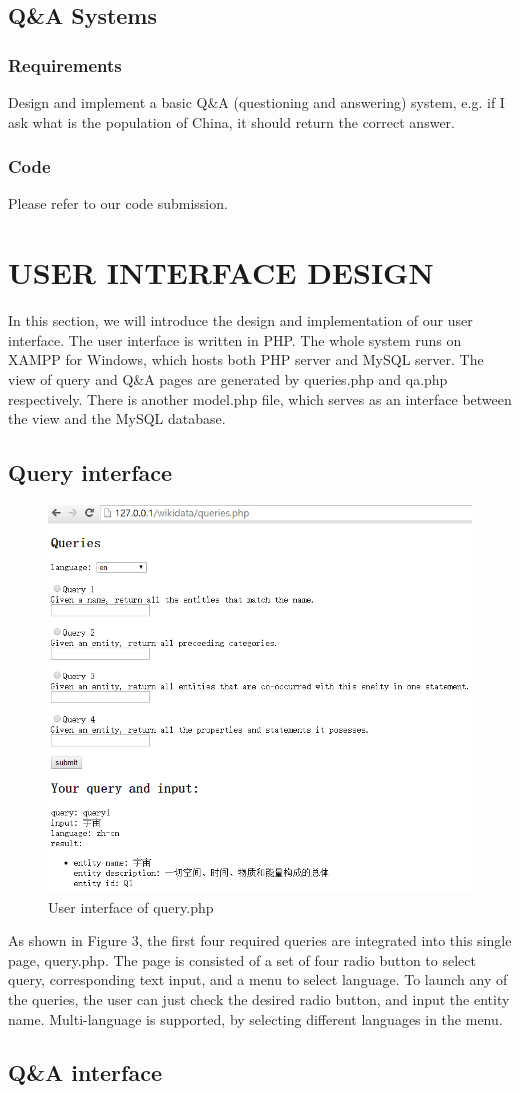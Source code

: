\documentclass[12pt]{article}
\begin{document}
\subsection{Q\&A Systems}
\subsubsection{Requirements}
Design and implement a basic Q\&A (questioning and answering) system, e.g. if I ask what is the population of China, it should return the correct answer.
\subsubsection{Code}
Please refer to our code submission.
\section{USER INTERFACE DESIGN}
In this section, we will introduce the design and implementation of our user interface. The user interface is written in PHP. The whole system runs on XAMPP for Windows, which hosts both PHP server and MySQL server. The view of query and Q\&A pages are generated by queries.php and qa.php respectively. There is another model.php file, which serves as an interface between the view and the MySQL database.
\subsection{Query interface}
\begin{figure}[H]
\centering
\label{fig:3}
\includegraphics[width=1\linewidth]{queryui.png}
\caption{User interface of query.php}
\end{figure}
As shown in Figure 3, the first four required queries are integrated into this single page, query.php. The page is consisted of a set of four radio button to select query, corresponding text input, and a menu to select language. To launch any of the queries, the user can just check the desired radio button, and input the entity name. Multi-language is supported, by selecting different languages in the menu. 
\subsection{Q\&A interface}
\end{document}
